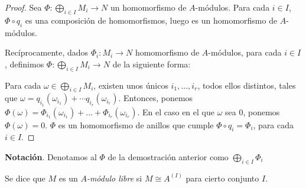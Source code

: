 \documentclass[../main.tex]{subfiles}
\begin{document}
\begin{proof}
Sea $\Phi:\bigoplus_{i\in I} M_i \rightarrow N$ un homomorfismo de $A$-módulos. Para cada $i\in I$, $\Phi \circ q_i$ es una composición de homomorfismos, luego es un homomorfismo de $A$-módulos.

Recíprocamente, dados $\Phi_i:M_i\rightarrow N$ homomorfismo de $A$-módulos, para cada $i\in I$, definimos $\Phi:\bigoplus_{i\in I} M_i\rightarrow N$ de la siguiente forma:

Para cada $\omega \in \bigoplus_{i\in I} M_i$, existen unos únicos $i_1,...,i_r$, todos ellos distintos, tales que $\omega=q_{i_1}(\omega_{i_1})+\cdots q_{i_r}(\omega_{i_r})$. Entonces, ponemos $\Phi(\omega)=\Phi_{i_1}(\omega_{i_1})+...+\Phi_{i_r}(\omega_{i_r})$. En el caso en el que $\omega$ sea $0$, ponemos $\Phi(\omega)=0$. $\Phi$ es un homomorfismo de anillos que cumple $\Phi\circ q_i = \Phi_i$, para cada $i\in I$.
\end{proof}

\textbf{Notación}. Denotamos al $\Phi$ de la demostración anterior como $\bigoplus_{i\in I} \Phi_i$

\begin{definition}
  Se dice que $M$ es un \textit{$A$-módulo libre} si $M \cong A^{(I)}$ para cierto conjunto $I$.
\end{definition}
\end{document}
